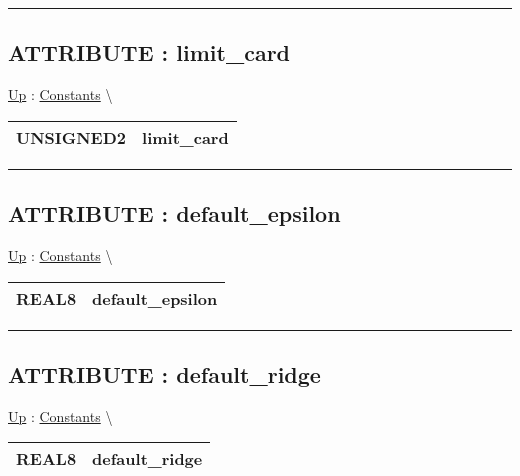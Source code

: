 \rule{\linewidth}{0.5pt}

\subsection*{ATTRIBUTE : limit\_card}
\hypertarget{ecldoc:logisticregression.constants.limit_card}{}
\hyperlink{ecldoc:LogisticRegression.Constants}{Up} :
\hspace{0pt} \hyperlink{ecldoc:LogisticRegression.Constants}{Constants} \textbackslash 

{\renewcommand{\arraystretch}{1.5}
\begin{tabularx}{\textwidth}{|>{\raggedright\arraybackslash}l|X|}
\hline
\hspace{0pt}UNSIGNED2 & limit\_card \\
\hline
\end{tabularx}
}

\par


\rule{\linewidth}{0.5pt}
\subsection*{ATTRIBUTE : default\_epsilon}
\hypertarget{ecldoc:logisticregression.constants.default_epsilon}{}
\hyperlink{ecldoc:LogisticRegression.Constants}{Up} :
\hspace{0pt} \hyperlink{ecldoc:LogisticRegression.Constants}{Constants} \textbackslash 

{\renewcommand{\arraystretch}{1.5}
\begin{tabularx}{\textwidth}{|>{\raggedright\arraybackslash}l|X|}
\hline
\hspace{0pt}REAL8 & default\_epsilon \\
\hline
\end{tabularx}
}

\par


\rule{\linewidth}{0.5pt}
\subsection*{ATTRIBUTE : default\_ridge}
\hypertarget{ecldoc:logisticregression.constants.default_ridge}{}
\hyperlink{ecldoc:LogisticRegression.Constants}{Up} :
\hspace{0pt} \hyperlink{ecldoc:LogisticRegression.Constants}{Constants} \textbackslash 

{\renewcommand{\arraystretch}{1.5}
\begin{tabularx}{\textwidth}{|>{\raggedright\arraybackslash}l|X|}
\hline
\hspace{0pt}REAL8 & default\_ridge \\
\hline
\end{tabularx}
}


